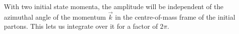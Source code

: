 \documentclass[../main.tex]{subfiles}
\begin{document}
With two initial state momenta, the amplitude will be independent of the
azimuthal angle of the momentum \(\vec{k}\) in the centre-of-mass frame of the initial partons.
This lets us integrate over it for a factor of \(2\pi\).

\end{document}
